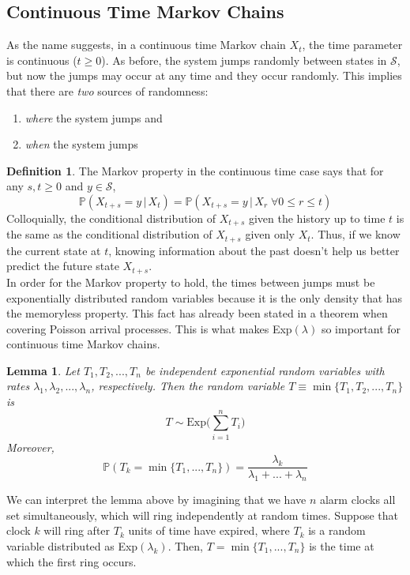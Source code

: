\documentclass{article}
\newtheorem{lemma}[theorem]{Lemma}
\theoremstyle{remark}
\theoremstyle{definition}
\newtheorem{definition}{Definition}[section]
\begin{document}
\subsection{Continuous Time Markov Chains}
As the name suggests, in a continuous time Markov chain $X_t$, the time parameter is continuous ($t \geq 0$). As before, the system jumps randomly between states in $\mathcal{S}$, but now the jumps may occur at any time and they occur randomly. This implies that there are \textit{two} sources of randomness:
\begin{enumerate}
    \item \textit{where} the system jumps and 
    \item \textit{when} the system jumps
\end{enumerate}

\begin{definition}
The Markov property in the continuous time case says that for any $s, t \geq 0$ and $y \in \mathcal{S}$, 
\[\mathbb{P}(X_{t + s} = y \, | \, X_t) = \mathbb{P}(X_{t+s} = y \, | \, X_r \; \forall 0 \leq r \leq t)\]
Colloquially, the conditional distribution of $X_{t+s}$ given the history up to time $t$ is the same as the conditional distribution of $X_{t+s}$ given only $X_t$. Thus, if we know the current state at $t$, knowing information about the past doesn't help us better predict the future state $X_{t+s}$. 
\\

In order for the Markov property to hold, the times between jumps must be exponentially distributed random variables because it is the only density that has the memoryless property. This fact has already been stated in a theorem when covering Poisson arrival processes. This is what makes Exp$(\lambda)$ so important for continuous time Markov chains. 
\end{definition}

\begin{lemma}
Let $T_1, T_2, ..., T_n$ be independent exponential random variables with rates $\lambda_1, \lambda_2, ..., \lambda_n$, respectively. Then the random variable $T \equiv \min\{T_1, T_2, ..., T_n\}$ is
\[T \sim \text{Exp}\Big(\sum_{i=1}^n T_i\Big)\]
Moreover, 
\[\mathbb{P}(T_k = \min\{T_1, ..., T_n\}) = \frac{\lambda_k}{\lambda_1 + ... + \lambda_n}\]
\end{lemma}

We can interpret the lemma above by imagining that we have $n$ alarm clocks all set simultaneously, which will ring independently at random times. Suppose that clock $k$ will ring after $T_k$ units of time have expired, where $T_k$ is a random variable distributed as Exp$(\lambda_k)$. Then, $T = \min\{T_1, ..., T_n\}$ is the time at which the first ring occurs. 
\end{document}
